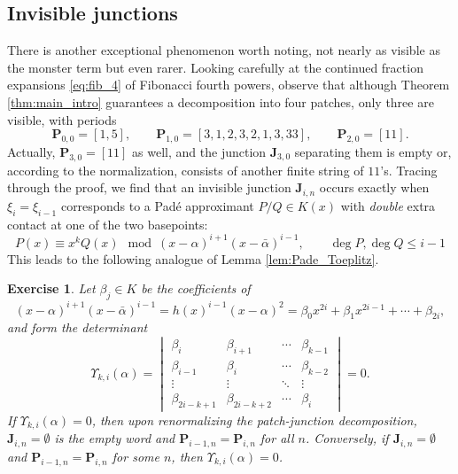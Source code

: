 \documentclass{article}
\numberwithin{equation}{section}
\newtheorem{exer}[thm]{Exercise}
\theoremstyle{definition}
\theoremstyle{remark}
\newcommand{\<}{\left\langle}
\renewcommand{\>}{\right\rangle}
\begin{document}
\subsection{Invisible junctions}
There is another exceptional phenomenon worth noting, not nearly as visible as the monster term but even rarer. Looking carefully at the continued fraction expansions \eqref{eq:fib_4} of Fibonacci fourth powers, observe that although Theorem \ref{thm:main_intro} guarantees a decomposition into four patches, only three are visible, with periods
\begin{equation}
  \mathbf{P}_{0,0} = [1, 5], \qquad \mathbf{P}_{1,0} = [3,1,2,3,2,1,3,33], \qquad \mathbf{P}_{2,0} = [11].
\end{equation}
Actually, $\mathbf{P}_{3,0} = [11]$ as well, and the junction $\mathbf{J}_{3,0}$ separating them is empty or, according to the normalization, consists of another finite string of $11$'s. Tracing through the proof, we find that an invisible junction $\mathbf{J}_{i,n}$ occurs exactly when $\xi_i = \xi_{i-1}$ corresponds to a Pad\'e approximant $P/Q \in K(x)$ with \emph{double} extra contact at one of the two basepoints:
\begin{equation*}
  P(x) \equiv x^k Q(x) \mod (x - \alpha)^{i+1} (x - \bar\alpha)^{i-1}, \qquad \deg P, \deg Q \leq i-1
\end{equation*}
This leads to the following analogue of Lemma \ref{lem:Pade_Toeplitz}.

\begin{exer} \label{exer:invisible}
  Let $\beta_j \in K$ be the coefficients of
  \begin{equation*}
    (x - \alpha)^{i+1} (x - \bar\alpha)^{i-1} = h(x)^{i-1} (x - \alpha)^2 = \beta_0 x^{2i} + \beta_1 x^{2i - 1} + \cdots + \beta_{2i},
  \end{equation*}
  and form the determinant
  \begin{equation}
    \Upsilon_{k,i}(\alpha) = \begin{vmatrix}
      \beta_i & \beta_{i+1} & \cdots & \beta_{k-1} \\
      \beta_{i-1} & \beta_i & \cdots & \beta_{k-2} \\
      \vdots & \vdots & \ddots & \vdots \\
      \beta_{2i-k+1} & \beta_{2i-k+2} & \cdots & \beta_i
    \end{vmatrix} = 0.
  \end{equation}
  If $\Upsilon_{k,i}(\alpha) = 0$, then upon renormalizing the patch-junction decomposition, $\mathbf{J}_{i,n} = \emptyset$ is the empty word and $\mathbf{P}_{i-1,n} = \mathbf{P}_{i,n}$ for all $n$. Conversely, if $\mathbf{J}_{i,n} = \emptyset$ and $\mathbf{P}_{i-1,n} = \mathbf{P}_{i,n}$ for some $n$, then $\Upsilon_{k,i}(\alpha) = 0$.
\end{exer}
\end{document}
